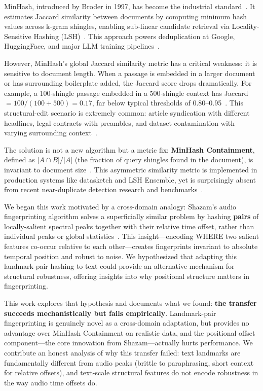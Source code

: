 \documentclass[11pt,letterpaper]{article}
\begin{document}
MinHash, introduced by Broder in 1997, has become the industrial standard~\citep{Broder1997}. It estimates Jaccard similarity between documents by computing minimum hash values across k-gram shingles, enabling sub-linear candidate retrieval via Locality-Sensitive Hashing (LSH)~\citep{IndykMotwani1998, Slaney2008}. This approach powers deduplication at Google, HuggingFace, and major LLM training pipelines~\citep{Lee2022, Gao2020, Penedo2023}.

However, MinHash's global Jaccard similarity metric has a critical weakness: it is sensitive to document length. When a passage is embedded in a larger document or has surrounding boilerplate added, the Jaccard score drops dramatically. For example, a 100-shingle passage embedded in a 500-shingle context has Jaccard $= 100/(100+500) = 0.17$, far below typical thresholds of 0.80--0.95~\citep{Leskovec2014, Manku2007}. This structural-edit scenario is extremely common: article syndication with different headlines, legal contracts with preambles, and dataset contamination with varying surrounding context~\citep{Manku2007, Wenzek2020, Lee2022}.

The solution is not a new algorithm but a metric fix: \textbf{MinHash Containment}, defined as $|A \cap B|/|A|$ (the fraction of query shingles found in the document), is invariant to document size~\citep{Broder1997}. This asymmetric similarity metric is implemented in production systems like datasketch and LSH Ensemble, yet is surprisingly absent from recent near-duplicate detection research and benchmarks~\citep{datasketch, Zhu2016}.

We began this work motivated by a cross-domain analogy: Shazam's audio fingerprinting algorithm solves a superficially similar problem by hashing \textbf{pairs} of locally-salient spectral peaks together with their relative time offset, rather than individual peaks or global statistics~\citep{Wang2003}. This insight---encoding WHERE two salient features co-occur relative to each other---creates fingerprints invariant to absolute temporal position and robust to noise. We hypothesized that adapting this landmark-pair hashing to text could provide an alternative mechanism for structural robustness, offering insights into why positional structure matters in fingerprinting.

This work explores that hypothesis and documents what we found: \textbf{the transfer succeeds mechanistically but fails empirically}. Landmark-pair fingerprinting is genuinely novel as a cross-domain adaptation, but provides no advantage over MinHash Containment on realistic data, and the positional offset component---the core innovation from Shazam---actually hurts performance. We contribute an honest analysis of why this transfer failed: text landmarks are fundamentally different from audio peaks (brittle to paraphrasing, short context for relative offsets), and text-scale structural features do not encode robustness in the way audio time offsets do.
\end{document}

